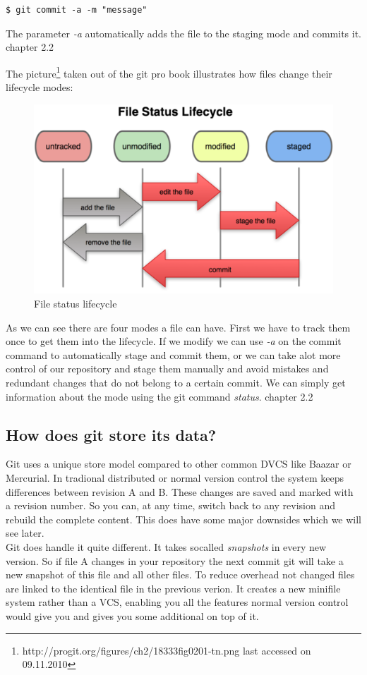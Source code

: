 \begin{lstlisting}
$ git commit -a -m "message"
\end{lstlisting}

The parameter \emph{-a} automatically adds the file to the staging mode and
commits it. \cite{gitpro2009} chapter 2.2

The picture\footnote{http://progit.org/figures/ch2/18333fig0201-tn.png last accessed on 
09.11.2010} taken out of the git pro book illustrates how files change their
lifecycle modes:

\begin{figure}[h]
  \centering
  \includegraphics{img/file_status_lifecycle}
  \caption{File status lifecycle}
  \label{fig:File status lifecycle}
  
\end{figure} 

As we can see there are four modes a file can have. First we have to track them
once to get them into the lifecycle. If we modify we can use \emph{-a} on the
commit command to automatically stage and commit them, or we can take alot more
control of our repository and stage them manually and avoid mistakes and
redundant changes that do not belong to a certain commit.
We can simply get information about the mode using the git command
\emph{status}. \cite{gitpro2009} chapter 2.2

\subsection{How does git store its data?}
Git uses a unique store model compared to other common DVCS like Baazar or Mercurial. 
In tradional distributed or normal version control the system keeps differences between revision A and B. 
These changes are saved and marked with a revision number. 
So you can, at any time, switch back to any revision and rebuild the complete content.
This does have some major downsides which we will see later. \\
Git does handle it quite different. It takes socalled \emph{snapshots} in every
new version. So if file A changes in your repository the next commit git will take a new snapshot of this file and all other files. 
To reduce overhead not changed files are linked to the identical file in the previous verion. 
It creates a new minifile system rather than a VCS, enabling you all the features normal version 
control would give you and gives you some additional on top of it. \cite{gitpro2009} 

